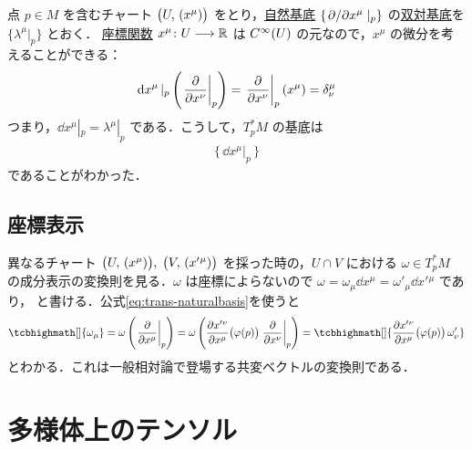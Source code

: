 \documentclass[geometry_main]{subfiles}
\begin{document}
点 $p \in M$ を含むチャート $\bigl(U,\, (x^\mu)\bigr)$ をとり，\hyperref[naturalbasis]{自然基底} $\{\pdv*{}{x^\mu}|_p\}$ の\hyperref[def.basisforDVS]{双対基底}を $\{\lambda^\mu|_p\}$ とおく．
\hyperref[def.localcoord]{座標関数} $x^\mu \colon U \longrightarrow \mathbb{R}$ は $C^\infty(U)$ の元なので，$x^\mu$ の微分を考えることができる：
\begin{align}
	\dd{x^\mu}|_p \left( \eval{\pdv{}{x^\nu}}_p \right) = \eval{\pdv{}{x^\nu}}_p(x^\mu) = \delta^\mu_\nu
\end{align}
つまり，$\dd{x^\mu}|_p = \lambda^\mu|_p$ である．こうして，$T_p^* M$ の基底は
\begin{align}
	\bigl\{\, \dd{x^\mu}|_p \,\bigr\}
\end{align}
であることがわかった．

\subsection{座標表示}

異なるチャート $\bigl(U,\, (x^\mu)\bigr),\; \bigl(V,\, (x'{}^\mu)\bigr)$ を採った時の，$U \cap V$ における $\omega \in T_p^*M$ の成分表示の変換則を見る．$\omega$ は座標によらないので $\omega = \omega_\mu \dd{x^\mu} = \omega'_\mu \dd{x'{}^\mu}$ であり，
と書ける．公式\eqref{eq:trans-naturalbasis}を使うと
\begin{align}
	\label{eq:1-form}
	\tcbhighmath[]{\omega_\mu} = \omega \left( \eval{\pdv{}{x^\mu}}_p \right) = \omega \left( \pdv{x'{}^\nu}{x^\mu}() \bigl( \varphi(p) \bigr) \eval{\pdv{}{x^\nu}}_{p}  \right) = \tcbhighmath[]{\pdv{x'{}^\nu}{x^\mu}() \bigl( \varphi(p) \bigr) \, \omega'_\nu}
\end{align}
とわかる．これは一般相対論で登場する共変ベクトルの変換則である．

\section{\cinfty 多様体上のテンソル}
\end{document}
